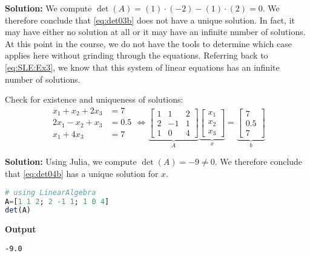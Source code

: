 \textbf{Solution:} We compute $\det(A) = (1)\cdot(-2)-(1)\cdot(2) = 0$. We therefore conclude that \eqref{eq:det03b} does not have a unique solution. In fact, it may have either no solution at all or it may have an infinite number of solutions. At this point in the course, we do not have the tools to determine which case applies here without grinding through the equations. Referring back to \eqref{eq:SLE:Ex3}, we know that this system of linear equations has an infinite number of solutions. 
\Qed


\begin{example}
\label{ex:Det04} 
Check for existence and uniqueness of solutions:
\begin{equation}
\label{eq:det04b}
\begin{aligned}
x_1+x_2+2x_3 &=7 \\
2x_1-x_2+x_3&=0.5\\
x_1 + 4 x_3 &=7 
\end{aligned}
\iff \underbrace{\left[\begin{array}{rrr} 1 & 1 & 2\\
2 & -1 & 1 \\ 1 & 0 & 4\end{array}\right]}_{A} \underbrace{\left[\begin{array}{c} x_1\\ x_2 \\ x_3\end{array}\right]}_{x} =   \underbrace{\left[\begin{array}{c} 7\\ 0.5 \\ 7\end{array}\right]}_{b}
\end{equation}
\end{example}

\textbf{Solution:}
Using Julia, we compute $\det(A) = -9 \neq 0$. We therefore conclude that \eqref{eq:det04b} has a unique solution for $x$.
\begin{lstlisting}[language=Julia,style=mystyle]
# using LinearAlgebra
A=[1 1 2; 2 -1 1; 1 0 4]
det(A)
\end{lstlisting}
\textbf{Output}
\begin{verbatim}
-9.0
\end{verbatim}
\Qed


